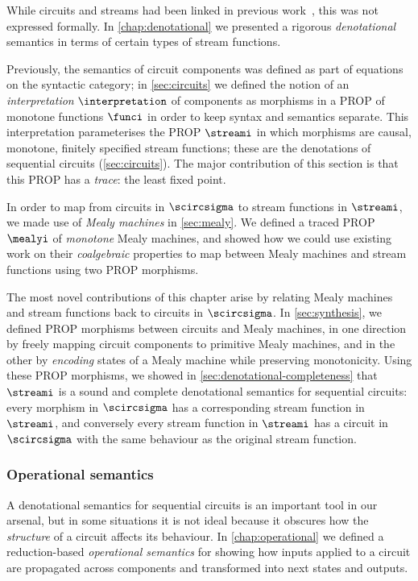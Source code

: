 While circuits and streams had been linked in previous
work~\cite{ghica2017diagrammatica}, this was not expressed formally.
In \cref{chap:denotational} we presented a rigorous \emph{denotational}
semantics in terms of certain types of stream functions.

Previously, the semantics of circuit components was defined as part of
equations on the syntactic category; in \cref{sec:circuits} we defined the
notion of an \emph{interpretation} \(\interpretation\) of components as
morphisms in a PROP of monotone functions \(\funci\) in order to keep syntax and
semantics separate.
This interpretation parameterises the PROP \(\streami\) in which morphisms are
causal, monotone, finitely specified stream functions; these are the denotations
of sequential circuits (\cref{sec:circuits}).
The major contribution of this section is that this PROP has a \emph{trace}: the
least fixed point.

In order to map from circuits in \(\scircsigma\) to stream functions in
\(\streami\), we made use of \emph{Mealy machines} in \cref{sec:mealy}.
We defined a traced PROP \(\mealyi\) of \emph{monotone} Mealy machines, and
showed how we could use existing work on their \emph{coalgebraic} properties
to map between Mealy machines and stream functions using two PROP morphisms.

The most novel contributions of this chapter arise by relating Mealy machines
and stream functions back to circuits in \(\scircsigma\).
In \cref{sec:synthesis}, we defined PROP morphisms between circuits and
Mealy machines, in one direction by freely mapping circuit components to
primitive Mealy machines, and in the other by \emph{encoding} states of a
Mealy machine while preserving monotonicity.
Using these PROP morphisms, we showed in \cref{sec:denotational-completeness}
that \(\streami\) is a sound and complete denotational semantics for sequential
circuits: every morphism in \(\scircsigma\) has a corresponding stream function
in \(\streami\), and conversely every stream function in \(\streami\) has
a circuit in \(\scircsigma\) with the same behaviour as the original stream
function.

\subsubsection{Operational semantics}

A denotational semantics for sequential circuits is an important tool in our
arsenal, but in some situations it is not ideal because it obscures how the
\emph{structure} of a circuit affects its behaviour.
In \cref{chap:operational} we defined a reduction-based
\emph{operational semantics} for showing how inputs applied to a circuit are
propagated across components and transformed into next states and outputs.

